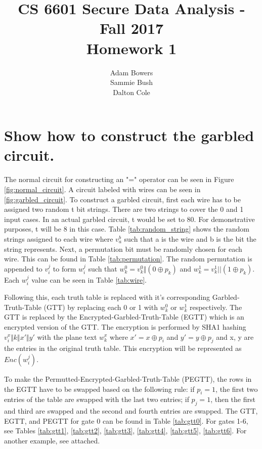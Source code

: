 \documentclass[times]{article}
\begin{document}
	\title{CS 6601 Secure Data Analysis - Fall 2017 \\ Homework 1}
	\author{Adam Bowers \\ Sammie Bush \\ Dalton Cole}
	\date{}
	\maketitle

	\section{Show how to construct the garbled circuit.}
	The normal circuit for constructing an "=" operator can be seen in Figure \ref{fig:normal_circuit}. A circuit labeled with wires can be seen in \ref{fig:garbled_circuit}. To construct a garbled circuit, first each wire has to be assigned two random t bit strings. There are two strings to cover the 0 and 1 input cases. In an actual garbled circuit, t would be set to 80. For demonstrative purposes, t will be 8 in this case. Table \ref{tab:random_string} shows the random strings assigned to each wire where $v_a^b$ such that a is the wire and b is the bit the string represents. Next, a permutation bit must be randomly chosen for each wire. This can be found in Table \ref{tab:permutation}. The random permutation is appended to $v_i^j$ to form $w_i^j$ such that $w_k^0 = v_k^0 \Vert (0 \oplus p_k)$ and $w_k^1 = v_k^1 || (1 \oplus p_k)$. Each $w_i^j$ value can be seen in Table \ref{tab:wire}. 

	Following this, each truth table is replaced with it's corresponding Garbled-Truth-Table (GTT) by replacing each 0 or 1 with $w_k^0$ or $w_k^1$ respectively. The GTT is replaced by the Encrypted-Garbled-Truth-Table (EGTT) which is an encrypted version of the GTT. The encryption is performed by SHA1 hashing $v_i^x \Vert k \Vert x' \Vert y'$ with the plane text $w_k^x$ where $x' = x \oplus p_i$ and  $y' = y \oplus p_j$ and x, y are the entries in the original truth table. This encryption will be represented as $Enc(w_i^j)$. 

	To make the Permutted-Encrypted-Garbled-Truth-Table (PEGTT), the rows in the EGTT have to be swapped based on the following rule: if $p_i = 1$, the first two entries of the table are swapped with the last two entries; if $p_j = 1$, then the first and third are swapped and the second and fourth entries are swapped. The GTT, EGTT, and PEGTT for gate 0 can be found in Table \ref{tab:gtt0}. For gates 1-6, see Tables \ref{tab:gtt1}, \ref{tab:gtt2}, \ref{tab:gtt3}, \ref{tab:gtt4}, \ref{tab:gtt5}, \ref{tab:gtt6}. For another example, see attached.
	
\end{document}
